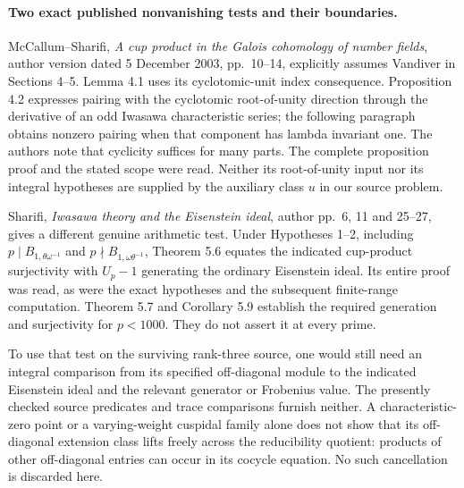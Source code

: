 \paragraph{Two exact published nonvanishing tests and their boundaries.}
McCallum--Sharifi, \emph{A cup product in the Galois
cohomology of number fields}, author version dated
5 December 2003, pp.~10--14, explicitly assumes
Vandiver in Sections 4--5.  Lemma 4.1 uses its
cyclotomic-unit index consequence.  Proposition 4.2
expresses pairing with the cyclotomic root-of-unity
direction through the derivative of an odd Iwasawa
characteristic series; the following paragraph obtains
nonzero pairing when that component has lambda
invariant one.  The authors note that cyclicity suffices
for many parts.  The complete proposition proof and
the stated scope were read.  Neither its root-of-unity
input nor its integral hypotheses are supplied by
the auxiliary class \(u\) in our source problem.

Sharifi, \emph{Iwasawa theory and the Eisenstein ideal},
author pp.~6, 11 and 25--27, gives a different genuine
arithmetic test.  Under Hypotheses 1--2, including
\(p\mid B_{1,\theta\omega^{-1}}\) and
\(p\nmid B_{1,\omega\theta^{-1}}\), Theorem 5.6
equates the indicated cup-product surjectivity with
\(U_p-1\) generating the ordinary Eisenstein ideal.
Its entire proof was read, as were the exact
hypotheses and the subsequent finite-range computation.
Theorem 5.7 and Corollary 5.9 establish the required
generation and surjectivity for \(p<1000\).
They do not assert it at every prime.

To use that test on the surviving rank-three source,
one would still need an integral comparison from its
specified off-diagonal module to the indicated
Eisenstein ideal and the relevant generator or
Frobenius value.  The presently checked source
predicates and trace comparisons furnish neither.
A characteristic-zero point or a varying-weight
cuspidal family alone does not show that its
off-diagonal extension class lifts freely across
the reducibility quotient: products of other
off-diagonal entries can occur in its cocycle
equation.  No such cancellation is discarded here.

